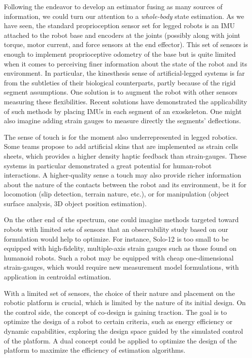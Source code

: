 Following the endeavor to develop an estimator fusing as many sources of information, we could turn our attention to a 
\textit{whole-body} state estimation. As we have seen, the standard proprioception sensor set for legged robots is an IMU attached to the robot base
and encoders at the joints (possibly along with joint torque, motor current, and force sensors at the end effector). This set of sensors
is enough to implement proprioceptive odometry of the base but is quite limited when it comes to perceiving finer information about the state of the robot
and its environment. In particular, the kinesthesis sense of artificial-legged systems is far from the subtleties of their biological counterparts, partly
because of the rigid segment assumptions. One solution is to augment the robot with other sensors measuring these flexibilities. Recent solutions have demonstrated
the applicability of such methods by placing IMUs in each segment of an exoskeleton. One might also imagine adding strain gauges to measure directly 
the segments' deflections. 

The sense of touch is for the moment also underrepresented in legged robotics. Some teams propose to add
artificial skins that are implemented as strain cells sheets, which provides a higher density haptic feedback than strain-gauges. 
These systems in particular demonstrated a great potential for human-robot interactions. 
A higher-quality sense a touch may also provide richer information about the nature of the contacts between the robot and its environment, be it for locomotion
(slip detection, terrain nature, etc.), or for manipulation (object surface analysis, 3D object position estimation). 

On the other end of the spectrum, one could imagine methods targeted toward robots with limited sets of sensors that
an observability study based on our formulation would help to optimize. For instance, Solo-12 is too small to be 
equipped with high-fidelity, multiple-axis strain gauges such as those found on humanoid robots. Such a robot may be equipped with cheap
one-dimensional strain-gauges, which would require new measurement model formulations, with application in centroidal estimation.

With a limited set of sensors, the choice of their nature and placement on the robotic platform is crucial, which is limited by the nature of its initial design. 
On the control side, the concept of co-design is gaining traction. The goal is
to optimize the design of a robot to certain criteria, such as energy efficiency or dynamic capabilities, exploring the design space guided by 
the simulated control of the platform. A dual concept could be applied to optimize the design of the platform to maximize the efficiency of estimation algorithms.

